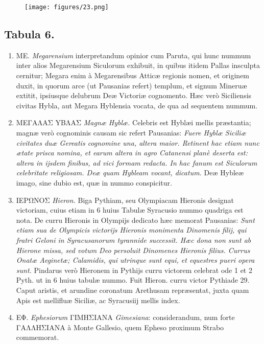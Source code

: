 \documentclass[a4paper, 11pt, oneside, polutonikogreek, latin]{article}
\begin{document}
\clearpage
\vspace*{\fill}
\begin{figure}[H]
\centering
\texttt{[image: figures/23.png]}
\end{figure}
\vspace*{\fill}
\clearpage
\subsection*{Tabula 6.}
\begin{enumerate}
    \item ME. \emph{Megarensium} interpretandum opinior cum Paruta, qui hunc nummum inter alios Megarensium Siculorum exhibuit, in quibus itidem Pallas insculpta cernitur; Megara enim à Megarensibus Atticæ regionis nomen, et originem duxit, in quorum arce (ut Pausanias refert) templum, et signum Mineruæ extitit, ipsiusque delubrum Deæ Victoriæ cognomento. Hæc verò Siciliensis civitas Hybla, aut Megara Hyblensia vocata, de qua ad sequentem nummum.

    \item MEΓAΛAΣ YBΛAΣ \emph{Magnæ Hyblæ.} Celebris est Hyblæi mellis præstantia; magnæ verò cognominis causam sic refert Pausanias: \emph{Fuere Hyblæ Siciliæ civitates duæ Gereatis cognomine una, altera maior. Retinent hac etiam nunc ætate prisca nomina, et earum altera in agro Catanensi planè deserta est: altera in ijsdem finibus, ad vici formam redacta. In hac fanum est Siculorum celebritate religiosam. Deæ quam Hybleam vocant, dicatum.} Deæ Hybleæ imago, sine dubio est, quæ in nummo conspicitur.

    \item IEPΩNOΣ \emph{Hieron.} Biga Pythiam, seu Olympiacam Hieronis designat victoriam, cuius etiam in 6 huius Tabulæ Syracusio nummo quadriga est nota. De curru Hieronis in Olympijs dedicato hæc memorat Pausanias: \emph{Sunt etiam sua de Olympicis victorijs Hieronis monimenta Dinomenis filij, qui fratri Geloni in Syracusanorum tyrannide successit. Hæc dona non sunt ab Hierone missa, sed votum Deo persoluit Dinomenes Hieronis filius. Currus Onatæ Aeginetæ; Calamidis, qui utrinque sunt equi, et equestres pueri opera sunt.} Pindarus verò Hieronem in Pythijs curru victorem celebrat ode 1 et 2 Pyth. ut in 6 huius tabulæ nummo. Fuit Hieron. curru victor Pythiade 29. Caput aristis, et arundine coronatum Arethusam repræsentat, juxta quam Apis est mellifluæ Siciliæ, ac Syracusiij mellis index.

    \item EΦ. \emph{Ephesiorum} ΓIMHΣIANA \emph{Gimesiana}: considerandum, num forte\\ ΓAΛΛHΣIANA à Monte Gallesio, quem Epheso proximum Strabo commemorat.


\end{enumerate}
\end{document}
